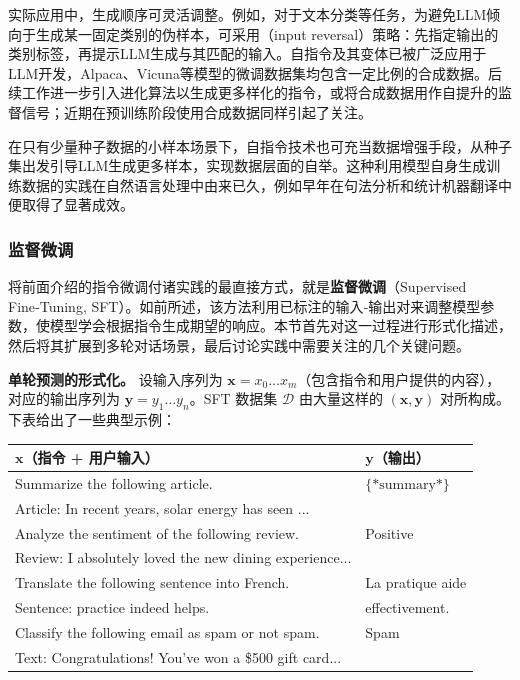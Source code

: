 实际应用中，生成顺序可灵活调整。例如，对于文本分类等任务，为避免LLM倾向于生成某一固定类别的伪样本，可采用（input reversal）策略：先指定输出的类别标签，再提示LLM生成与其匹配的输入\cite{longpre-etal:2023flan}。自指令及其变体已被广泛应用于LLM开发，Alpaca、Vicuna等模型的微调数据集均包含一定比例的合成数据\cite{ouyang-etal:2022training,taori-etal:2023alpaca,chiang-etal:2023vicuna}。后续工作进一步引入进化算法以生成更多样化的指令\cite{xu-etal:2024wizardlm}，或将合成数据用作自提升的监督信号\cite{chen-etal:2024self}；近期在预训练阶段使用合成数据同样引起了关注\cite{gunasekar-etal:2023textbooks,allal-etal:2024cosmopedia}。

在只有少量种子数据的小样本场景下，自指令技术也可充当数据增强手段，从种子集出发引导LLM生成更多样本，实现数据层面的自举。这种利用模型自身生成训练数据的实践在自然语言处理中由来已久，例如早年在句法分析和统计机器翻译中便取得了显著成效\cite{charniak:1997statistical,sennrich-etal:2016improving}。


\subsubsection{监督微调}

\noindent 将前面介绍的指令微调付诸实践的最直接方式，就是\textbf{监督微调}（Supervised Fine‑Tuning, SFT）。如前所述，该方法利用已标注的输入‑输出对来调整模型参数，使模型学会根据指令生成期望的响应。本节首先对这一过程进行形式化描述，然后将其扩展到多轮对话场景，最后讨论实践中需要关注的几个关键问题。

\vspace{0.5em}
\noindent\textbf{单轮预测的形式化。}
设输入序列为 $\mathbf{x}=x_0\dots x_m$（包含指令和用户提供的内容），对应的输出序列为 $\mathbf{y}=y_1\dots y_n$。SFT 数据集 $\mathcal{D}$ 由大量这样的 $(\mathbf{x}, \mathbf{y})$ 对所构成。下表给出了一些典型示例：

\begin{center}
\begin{tabular}{l | l}
$\mathbf{x}$（指令 + 用户输入） & $\mathbf{y}$（输出） \\ \hline
\colorbox{gray!30}{Summarize the following article.} & $\{*\textrm{summary}*\}$ \\
Article: In recent years, solar energy has seen ... & \\ \hline
\colorbox{gray!30}{Analyze the sentiment of the following review.} & Positive \\
Review: I absolutely loved the new dining experience... & \\ \hline
\colorbox{gray!30}{Translate the following sentence into French.} & La pratique aide \\
Sentence: practice indeed helps. & effectivement. \\ \hline
\colorbox{gray!30}{Classify the following email as spam or not spam.} & Spam \\
Text: Congratulations! You've won a \$500 gift card... & \\
\end{tabular}
\end{center}

